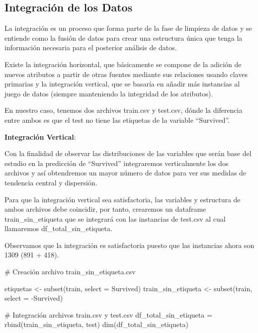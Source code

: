 \documentclass[
]{article}
\newenvironment{Shaded}{\begin{snugshade}}{\end{snugshade}}
\newcommand{\CommentTok}[1]{\textcolor[rgb]{0.50,0.62,0.50}{#1}}
\newcommand{\DataTypeTok}[1]{\textcolor[rgb]{0.87,0.87,0.75}{#1}}
\newcommand{\KeywordTok}[1]{\textcolor[rgb]{0.94,0.87,0.69}{#1}}
\newcommand{\NormalTok}[1]{\textcolor[rgb]{0.80,0.80,0.80}{#1}}
\newcommand{\OperatorTok}[1]{\textcolor[rgb]{0.94,0.94,0.82}{#1}}
\newcommand{\StringTok}[1]{\textcolor[rgb]{0.80,0.58,0.58}{#1}}
\begin{document}
\hypertarget{integraciuxf3n-de-los-datos}{%
\subsection{\texorpdfstring{\textbf{Integración de los
Datos}}{Integración de los Datos}}\label{integraciuxf3n-de-los-datos}}

La integración es un proceso que forma parte de la fase de limpieza de
datos y se entiende como la fusión de datos para crear una estructura
única que tenga la información necesaria para el posterior análisis de
datos.

Existe la integración horizontal, que básicamente se compone de la
adición de nuevos atributos a partir de otras fuentes mediante sus
relaciones usando claves primarias y la integración vertical, que se
basaría en añadir más instancias al juego de datos (siempre manteniendo
la integridad de los atributos).

En nuestro caso, tenemos dos archivos train.csv y test.csv, dónde la
diferencia entre ambos es que el test no tiene las etiquetas de la
variable ``Survived''.

\textbf{Integración Vertical}:

Con la finalidad de observar las distribuciones de las variables que
serán base del estudio en la predicción de ``Survived'' integraremos
verticalmente los dos archivos y así obtendremos un mayor número de
datos para ver sus medidas de tendencia central y dispersión.

Para que la integración vertical sea satisfactoria, las variables y
estructura de ambos archivos debe coincidir, por tanto, crearemos un
dataframe train\_sin\_etiqueta que se integrará con las instancias de
test.csv al cual llamaremos df\_total\_sin\_etiqueta.

Observamos que la integración es satisfactoria puesto que las instancias
ahora son 1309 (891 + 418).

\begin{Shaded}
\begin{Highlighting}[]
\CommentTok{# Creación archivo train_sin_etiqueta.csv}

\NormalTok{etiquetas <-}\StringTok{ }\KeywordTok{subset}\NormalTok{(train, }\DataTypeTok{select =}\NormalTok{ Survived)}
\NormalTok{train_sin_etiqueta <-}\StringTok{ }\KeywordTok{subset}\NormalTok{(train, }\DataTypeTok{select =} \OperatorTok{-}\NormalTok{Survived)}

\CommentTok{# Integración archivos train.csv y test.csv}
\NormalTok{df_total_sin_etiqueta =}\StringTok{ }\KeywordTok{rbind}\NormalTok{(train_sin_etiqueta, test)}
\KeywordTok{dim}\NormalTok{(df_total_sin_etiqueta)}
\end{Highlighting}
\end{Shaded}
\end{document}
